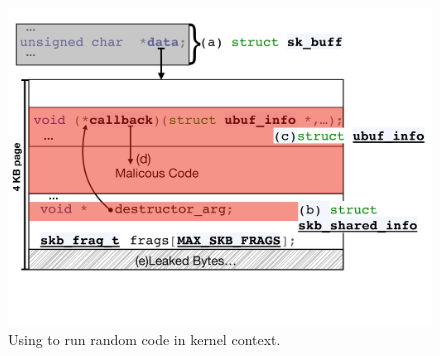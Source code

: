 \begin{figure}[ht]
    \centering
    \includegraphics[width=\linewidth]{figs/ubuf.pdf}
    \caption{Using \shinfo to run random code in kernel context.}
    \label{fig:sh_info}
\end{figure}
